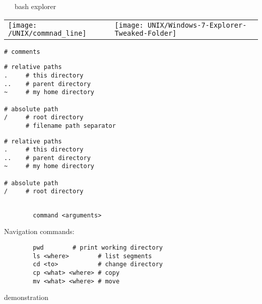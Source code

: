 \documentclass[xcolor=dvipsnames]{beamer}
\begin{document}
\begin{frame}
	~~~bash \hfill explorer~~~
	\begin{center}
	\begin{tabular}{L{0.5\textwidth}L{0.5\textwidth}}
		\texttt{[image: /UNIX/commnad\_line]} &
		\texttt{[image: UNIX/Windows-7-Explorer-Tweaked-Folder]} \\
	\end{tabular}
	\end{center}
\end{frame}

\begin{frame}[fragile]
\begin{verbatim}
# comments
\end{verbatim}
\end{frame}

\begin{frame}[fragile]
\begin{verbatim}
# relative paths
.     # this directory
..    # parent directory
~     # my home directory

# absolute path
/     # root directory
      # filename path separator

\end{verbatim}
\end{frame}

\begin{frame}[fragile]
\begin{verbatim}
# relative paths
.     # this directory
..    # parent directory
~     # my home directory

# absolute path
/     # root directory


\end{verbatim}
\end{frame}

\begin{frame}[fragile]
	\begin{verbatim}
		command <arguments>
	\end{verbatim}
	Navigation commands:
	\begin{verbatim}
		pwd        # print working directory
		ls <where>        # list segments
		cd <to>           # change directory
		cp <what> <where> # copy
		mv <what> <where> # move
	\end{verbatim}
\end{frame}

\begin{frame}
	\Huge
	\begin{center}
		demonstration
	\end{center}
\end{frame}
\end{document}
